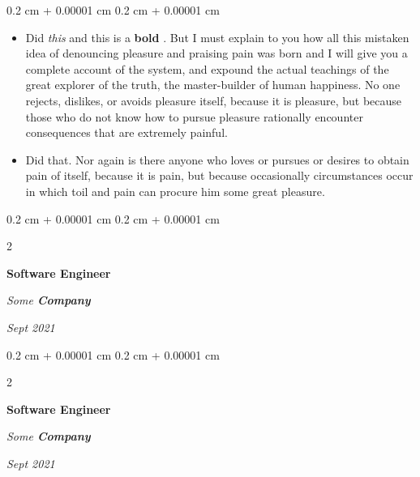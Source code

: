 \documentclass[10pt, letterpaper]{article}
\newenvironment{highlights}{
    \begin{itemize}[
        topsep=0.10 cm,
        parsep=0.10 cm,
        partopsep=0pt,
        itemsep=0pt,
        leftmargin=0.4 cm + 10pt
    ]
}{
    \end{itemize}
} %
\newenvironment{onecolentry}{
    \begin{adjustwidth}{
        0.2 cm + 0.00001 cm
    }{
        0.2 cm + 0.00001 cm
    }
}{
    \end{adjustwidth}
} %
\newenvironment{twocolentry}[2][]{
    \onecolentry
    \def\secondColumn{#2}
    \setcolumnwidth{\fill, 4.5 cm}
    \begin{paracol}{2}
}{
    \switchcolumn \raggedleft \secondColumn
    \end{paracol}
    \endonecolentry
} %
\let\hrefWithoutArrow\href
\renewcommand{\href}[2]{\hrefWithoutArrow{#1}{\ifthenelse{\equal{#2}{}}{ }{#2 }\raisebox{.15ex}{\footnotesize \faExternalLink*}}}
\begin{document}
        \vspace{0.10 cm}
        \begin{onecolentry}
            \begin{highlights}
                \item Did \textit{this} and this is a \textbf{bold} \href{https://example.com}{link}. But I must explain to you how all this mistaken idea of denouncing pleasure and praising pain was born and I will give you a complete account of the system, and expound the actual teachings of the great explorer of the truth, the master-builder of human happiness. No one rejects, dislikes, or avoids pleasure itself, because it is pleasure, but because those who do not know how to pursue pleasure rationally encounter consequences that are extremely painful.
                \item Did that. Nor again is there anyone who loves or pursues or desires to obtain pain of itself, because it is pain, but because occasionally circumstances occur in which toil and pain can procure him some great pleasure.
            \end{highlights}
        \end{onecolentry}


        \vspace{0.2 cm}

            \begin{twocolentry}{


        \textit{Sept 2021}    }
                \textbf{Software Engineer}

                \textit{Some \textbf{Company}}
            \end{twocolentry}



        \vspace{0.2 cm}

            \begin{twocolentry}{


        \textit{Sept 2021}    }
                \textbf{Software Engineer}

                \textit{Some \textbf{Company}}
            \end{twocolentry}
\end{document}

